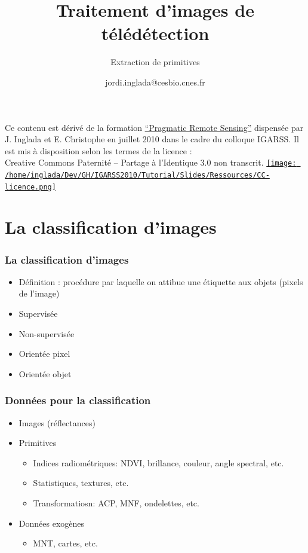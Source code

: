 \documentclass[compress]{beamer}
\title{Traitement d'images de télédétection}
\subtitle{Extraction de primitives}
\author
{jordi.inglada@cesbio.cnes.fr}
\institute[Cesbio] %
{\textsc{Centre d'Études Spatiales de la Biosphère, Toulouse, France}}
\date{}
\begin{document}
\begin{frame}
  \titlepage
  \begin{center}
{\tiny Ce contenu est dérivé de la formation \href{http://www.orfeo-toolbox.org/packages/PragmaticRemoteSensing-handout.pdf}{``Pragmatic Remote
  Sensing''} dispensée par J. Inglada et E. Christophe en juillet 2010
  dans le cadre du colloque IGARSS. Il est mis à disposition selon les termes de la licence :\\
Creative Commons Paternité – Partage à l’Identique 3.0 non transcrit.} \href{http://creativecommons.org/licenses/by-sa/3.0/}{\texttt{[image: /home/inglada/Dev/GH/IGARSS2010/Tutorial/Slides/Ressources/CC-licence.png]}}    
  \end{center}
\end{frame}


\section[Intro]{La classification d'images}
\begin{frame}
\frametitle{La classification d'images}
  \begin{itemize}
  \item Définition : procédure par laquelle on attibue une étiquette
    aux objets (pixels de l'image)
  \item Supervisée
  \item Non-supervisée
  \item Orientée pixel
  \item Orientée objet
  \end{itemize}
\end{frame}

\begin{frame}
  \frametitle{Données pour la classification}
  \begin{itemize}
  \item Images (réflectances)
  \item Primitives
    \begin{itemize}
    \item Indices radiométriques: NDVI, brillance, couleur, angle
      spectral, etc.
    \item Statistiques, textures, etc.
    \item Transformatiosn: ACP, MNF, ondelettes, etc.
    \end{itemize}
  \item Données exogènes
    \begin{itemize}
    \item MNT, cartes, etc.
    \end{itemize}
  \end{itemize}
\end{frame}
\end{document}
